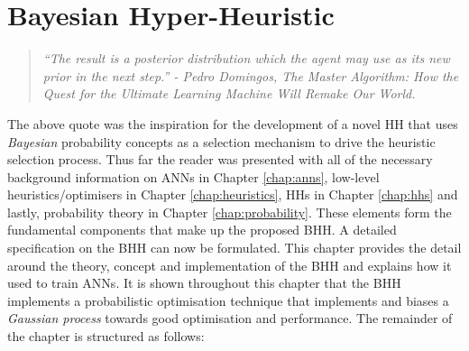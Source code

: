 \chapter{Bayesian Hyper-Heuristic}
\label{chap:bhh}

\begin{quote}
      \textit{
            ``The result is a posterior distribution which the agent may use as its new prior in the next step.'' - Pedro Domingos, The Master Algorithm: How the Quest for the Ultimate Learning Machine Will Remake Our World.
      }
\end{quote}

The above quote was the inspiration for the development of a novel \ac{HH} that uses \textit{Bayesian} probability concepts as a selection mechanism to drive the heuristic selection process. Thus far the reader was presented with all of the necessary background information on \acp{ANN} in Chapter \ref{chap:anns}, low-level heuristics/optimisers in Chapter \ref{chap:heuristics}, \acp{HH} in Chapter \ref{chap:hhs}  and lastly, probability theory in Chapter \ref{chap:probability}. These elements form the fundamental components that make up the proposed \Ac{BHH}. A detailed specification on the \Ac{BHH} can now be formulated. This chapter provides the detail around the theory, concept and implementation of the \Ac{BHH} and explains how it used to train \acp{ANN}. It is shown throughout this chapter that the \Ac{BHH} implements a probabilistic optimisation technique that implements and biases a \textit{Gaussian process} towards good optimisation and performance. The remainder of the chapter is structured as follows:

